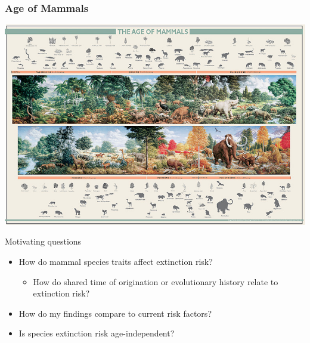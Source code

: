 \documentclass{beamer}
\begin{document}
\begin{frame}
  \frametitle{Age of Mammals}
  \begin{center}
    \includegraphics[width = \textwidth,height = 0.8\textheight,keepaspectratio = true]{figure/aom}
  \end{center}
\end{frame}

\begin{frame}
  \begin{alertblock}{Motivating questions}
    \begin{itemize}
      \item \alert{How do mammal species traits affect extinction risk?}
        \begin{itemize}
          \item How do shared time of origination or evolutionary history relate to extinction risk?
        \end{itemize}
      \item How do my findings compare to current risk factors?
      \item Is species extinction risk age-independent?
    \end{itemize}
  \end{alertblock}
\end{frame}
\end{document}
